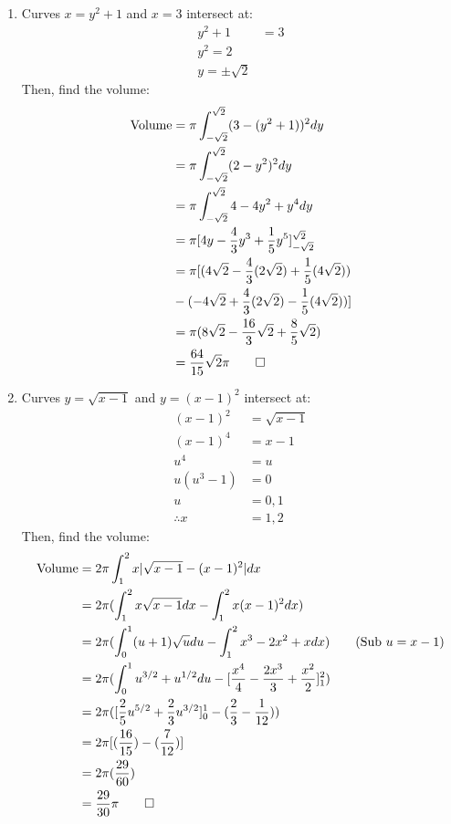 \documentclass[12pt, a4paper]{article}
\begin{document}
\begin{enumerate}[Q\arabic*.]
  \item Curves $x = y^2+1$ and $x=3$ intersect at:
    \begin{align*}
      y^2 + 1 &= 3\\
      y^2 = 2\\
      y = \pm\sqrt{2}
    \end{align*}
    Then, find the volume:
    \begin{align*}
      \text{Volume} &= \pi\int^{\sqrt{2}}_{-\sqrt{2}}(3 - (y^2 + 1))^2 dy\\
                    &= \pi\int^{\sqrt{2}}_{-\sqrt{2}}(2-y^2)^2 dy\\
                    &= \pi\int^{\sqrt{2}}_{-\sqrt{2}} 4- 4y^2 + y^4 dy\\
                    &= \pi[4y - \frac{4}{3}y^3 + \frac{1}{5}y^5]^{\sqrt{2}}_{-\sqrt{2}}\\
                    &= \pi[(4\sqrt{2} - \frac{4}{3}(2\sqrt{2}) + \frac{1}{5}(4\sqrt{2})) \\&- (-4\sqrt{2} +\frac{4}{3}(2\sqrt{2}) -\frac{1}{5}(4\sqrt{2}))]\\
                    &= \pi(8\sqrt{2}-\frac{16}{3}\sqrt{2}+\frac{8}{5}\sqrt{2})\\
                    &= \frac{64}{15}\sqrt{2}\pi\qed
    \end{align*}
  \pagebreak
  \item Curves $y=\sqrt{x-1}$ and $y=(x-1)^2$ intersect at:
    \begin{align*}
      (x-1)^2 &= \sqrt{x-1}\\
      (x-1)^4 &= x-1\\
      u^4 &= u\tag*{(Sub $u=x-1$)}\\
      u(u^3-1) &= 0\\
      u &= 0, 1\\
      \therefore x &= 1, 2
    \end{align*}
    Then, find the volume:
    \begin{align*}
      \text{Volume} &= 2\pi \int^2_1 x|\sqrt{x-1}-(x-1)^2|dx\\
                    &= 2\pi(\int^2_1x\sqrt{x-1}dx - \int^2_1x(x-1)^2dx)\\
                    &= 2\pi(\int^1_0(u+1)\sqrt{u}du - \int^2_1x^3-2x^2+x dx)\tag*{(Sub $u = x-1$)}\\
                    &= 2\pi(\int^1_0u^{3/2}+u^{1/2}du - [\frac{x^4}{4} - \frac{2x^3}{3}+\frac{x^2}{2}]^2_1)\\
                    &= 2\pi([\frac{2}{5}u^{5/2} + \frac{2}{3}u^{3/2}]^1_0 - (\frac{2}{3} - \frac{1}{12}))\\
                    &= 2\pi[(\frac{16}{15}) - (\frac{7}{12})]\\
                    &= 2\pi(\frac{29}{60})\\
                    &= \frac{29}{30}\pi \qed
    \end{align*}
\end{enumerate}
\end{document}
